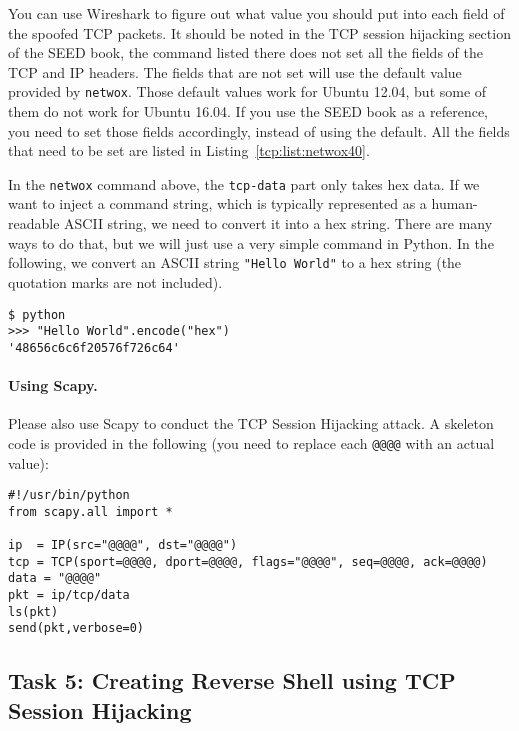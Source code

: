 You can use Wireshark to figure out what value you should put into each field of the 
spoofed TCP packets. It should be noted in the TCP session hijacking section of the 
SEED book, the command listed there does not set all the fields of the TCP and IP
headers. The fields that are not set will use the default value provided
by \texttt{netwox}. Those default 
values work for Ubuntu 12.04, but some of them do not work for Ubuntu 16.04. 
If you use the SEED book as a reference, you need to set those fields accordingly, instead 
of using the default. All the 
fields that need to be set are listed in Listing~\ref{tcp:list:netwox40}.


In the \texttt{netwox} command above, the \texttt{tcp-data} part only 
takes hex data. If we want to inject a command string, which is typically represented 
as a human-readable ASCII string, we need to convert it into  a hex string. 
There are many ways to do that, but we will just use a very simple command in Python. 
In the following, we convert an ASCII string \texttt{"Hello World"} to
a hex string (the quotation marks are not included).

\begin{lstlisting}
$ python
>>> "Hello World".encode("hex")
'48656c6c6f20576f726c64'
\end{lstlisting}


\paragraph{Using Scapy.} Please also use Scapy to conduct the TCP Session Hijacking attack.
A skeleton code is provided in the following (you need to replace each
\texttt{@@@@} with an actual value):


\begin{lstlisting}
#!/usr/bin/python
from scapy.all import *

ip  = IP(src="@@@@", dst="@@@@")
tcp = TCP(sport=@@@@, dport=@@@@, flags="@@@@", seq=@@@@, ack=@@@@)
data = "@@@@"
pkt = ip/tcp/data
ls(pkt)
send(pkt,verbose=0)
\end{lstlisting}




\subsection{Task 5: Creating Reverse Shell using TCP Session Hijacking}

